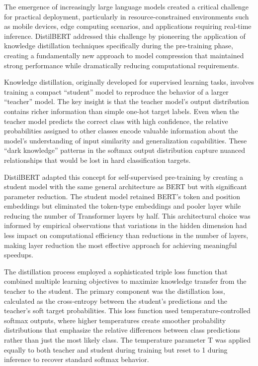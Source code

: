 \documentclass[
  titlepage]{article}
\begin{document}
The emergence of increasingly large language models created a critical
challenge for practical deployment, particularly in resource-constrained
environments such as mobile devices, edge computing scenarios, and
applications requiring real-time inference. DistilBERT addressed this
challenge by pioneering the application of knowledge distillation
techniques specifically during the pre-training phase, creating a
fundamentally new approach to model compression that maintained strong
performance while dramatically reducing computational requirements.

Knowledge distillation, originally developed for supervised learning
tasks, involves training a compact ``student'' model to reproduce the
behavior of a larger ``teacher'' model. The key insight is that the
teacher model's output distribution contains richer information than
simple one-hot target labels. Even when the teacher model predicts the
correct class with high confidence, the relative probabilities assigned
to other classes encode valuable information about the model's
understanding of input similarity and generalization capabilities. These
``dark knowledge'' patterns in the softmax output distribution capture
nuanced relationships that would be lost in hard classification targets.

DistilBERT adapted this concept for self-supervised pre-training by
creating a student model with the same general architecture as BERT but
with significant parameter reduction. The student model retained BERT's
token and position embeddings but eliminated the token-type embeddings
and pooler layer while reducing the number of Transformer layers by
half. This architectural choice was informed by empirical observations
that variations in the hidden dimension had less impact on computational
efficiency than reductions in the number of layers, making layer
reduction the most effective approach for achieving meaningful speedups.

The distillation process employed a sophisticated triple loss function
that combined multiple learning objectives to maximize knowledge
transfer from the teacher to the student. The primary component was the
distillation loss, calculated as the cross-entropy between the student's
predictions and the teacher's soft target probabilities. This loss
function used temperature-controlled softmax outputs, where higher
temperatures create smoother probability distributions that emphasize
the relative differences between class predictions rather than just the
most likely class. The temperature parameter T was applied equally to
both teacher and student during training but reset to 1 during inference
to recover standard softmax behavior.
\end{document}
